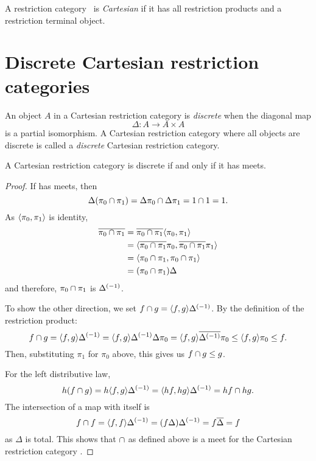 \begin{definition}\label{def:cartesian_restriction_category}
  A restriction category \X\ is \emph{Cartesian} if it has all restriction products
  and a restriction terminal object.
\end{definition}

\section{Discrete Cartesian restriction categories}\label{sub:discrete_restriction_categories}

\begin{definition}\label{def:discrete_object_and_discrete_cartesian}
  An object $A$ in a Cartesian restriction category is \emph{discrete}
  when the diagonal map
  \[
    \Delta:A \to A \times A
  \]
  is a partial isomorphism.
  A  Cartesian restriction category where all objects are
  discrete is called a \emph{discrete} Cartesian restriction category.
\end{definition}

\begin{theorem}\label{thm:a_crc_is_discrete_iff_it_has_meets}
  A Cartesian restriction category \X is discrete if and only if it has meets.
\end{theorem}
\begin{proof}
  If \X has meets, then
  \[
    \Delta(\pi_0 \cap \pi_1) = \Delta\pi_0 \cap \Delta\pi_1 = 1\cap 1 = 1.
  \]
  As $\langle\pi_0,\pi_1\rangle$ is identity,
  \begin{align*}
    \overline{\pi_0 \cap \pi_1} &= \overline{\pi_0 \cap \pi_1} \langle\pi_0, \pi_1\rangle \\
    &=\langle\overline{\pi_0 \cap \pi_1}\pi_0, \overline{\pi_0 \cap \pi_1}\pi_1\rangle\\
    &=\langle\pi_0 \cap \pi_1,\pi_0 \cap \pi_1\rangle\\
    &=(\pi_0 \cap \pi_1 )\Delta
  \end{align*}
  and therefore, $\pi_0 \cap \pi_1$ is ${\Delta}^{(-1)}$.

  To show the other direction, we set $f\cap g = \langle f,g\rangle{\Delta}^{(-1)}$.
  By the definition of the restriction product:
  \[
    f \cap g =  \langle f,g\rangle{\Delta}^{(-1)} =\langle f,g\rangle{\Delta}^{(-1)} \Delta \pi_0 =
      \langle f,g\rangle\overline{{\Delta}^{(-1)}}\pi_0 \le \langle f,g\rangle\pi_0 \le f.
  \]
  Then, substituting $\pi_1$ for $\pi_0$ above, this gives us $f \cap g \le g$.

  For the left distributive law,
  \[
    h(f \cap g) = h \langle f,g\rangle{\Delta}^{(-1)} =  \langle h f,h g\rangle{\Delta}^{(-1)} = h f \cap h g.
  \]
  The intersection of a map with itself is
  \[
    f\cap f = \langle f,f\rangle {\Delta}^{(-1)} = (f \Delta) {\Delta}^{(-1)} = f \overline{\Delta} = f
  \]
  as $\Delta$ is total. This shows that $\cap$ as defined above is a meet for the
  Cartesian restriction category \X.

\end{proof}

